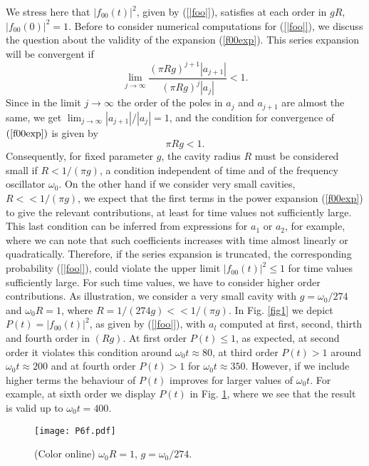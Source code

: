 \documentclass[10pt,english,twocolumn]{revtex4}
\begin{document}
%
We stress here that $|f_{00}(t)|^2$, given by (\ref{|foo|}), satisfies at each order in $gR$, $|f_{00}(0)|^2=1$. 
Before to consider  numerical computations for (\ref{|foo|}), we discuss the question about the validity of
the expansion (\ref{f00exp}). This series expansion will be convergent if
\begin{equation}
\lim_{j\to\infty} \frac{(\pi R g)^{j+1}|a_{j+1}|}{(\pi R g)^j|a_j|}<1.
\end{equation}
Since in the limit $j\to\infty$ the order of the poles in $a_j$ and $a_{j+1}$ are almost the same, we get $\lim_{j\to\infty}|a_{j+1}|/|a_j|=1$,
and  the condition for convergence of  $(\ref{f00exp})$ is given by
\begin{equation}
\pi R g<1.
\label{validity}
\end{equation}
Consequently, for fixed parameter $g$, the cavity radius $R$ must be considered  small if $R<1/(\pi g)$, a condition
independent of time and of the frequency oscillator $\omega_0$. On the other hand if we consider very small cavities, 
$R<<1/(\pi g)$, we expect that the first terms in the power expansion (\ref{f00exp}) to give the relevant contributions,
at least for time values not sufficiently large. This last condition can be inferred from expressions for $a_1$ or $a_2$, for
example, where we can note that such coefficients increases with time almost linearly or quadratically. Therefore, if the
series expansion is truncated, the corresponding probability (\ref{|foo|}), could violate
the upper limit $|f_{00}(t)|^2\leq 1$ for time values sufficiently large. For such time values, we have to consider higher order
contributions. As illustration, we consider a very small cavity with  $g=\omega_0/274$ and $\omega_0R=1$, where 
$R=1/(274 g)<<1/(\pi g)$. 
In Fig. \ref{fig1} we depict $P(t)=|f_{00}(t)|^2$, as given by (\ref{|foo|}), with $a_{l}$ computed at first, second, thirth
and fourth order in $(Rg)$.
At  first order  $P(t)\leq 1$,  as expected,
at second order it violates this condition around $\omega_0t \approx80$, at third order $P(t)>1$ around 
$\omega_0t\approx 200$ and at fourth order $P(t)>1$ for $\omega_0 t\approx 350$.  However, if we include higher terms
the behaviour of $P(t)$  improves for larger values of  $\omega_0 t$. For example, at sixth order we display $P(t)$  in
Fig. \ref{fig2},  where we see that the result is valid up to $\omega_0 t=400$. 
\begin{figure}[ht]
\texttt{[image: P6f.pdf]}
 \caption{(Color online) $\omega_0R=1$, $g=\omega_0/274$.}
\label{fig2} 
\end{figure}
\end{document}
